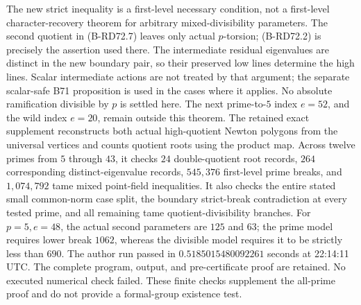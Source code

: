 \begin{remark}
\label{rem:B-RD72-scope}
The new strict inequality is a first-level necessary condition,
not a first-level character-recovery theorem for arbitrary
mixed-divisibility parameters. The second quotient in
(B-RD72.7) leaves only actual \(p\)-torsion; (B-RD72.2) is
precisely the assertion used there.
The intermediate residual eigenvalues are distinct in the new
boundary pair, so their preserved low lines determine the high
lines. Scalar intermediate actions are not treated by that
argument; the separate scalar-safe B71 proposition is used in
the cases where it applies.
No absolute ramification divisible by \(p\) is settled here.
The next prime-to-\(5\) index \(e=52\), and the wild index
\(e=20\), remain outside this theorem.
The retained exact supplement
reconstructs both actual high-quotient Newton polygons from the
universal vertices and counts quotient roots using the product map.
Across twelve primes from \(5\) through \(43\), it checks
\(24\) double-quotient root records, \(264\) corresponding
distinct-eigenvalue records, \(545{,}376\) first-level prime breaks,
and \(1{,}074{,}792\) tame mixed point-field inequalities.
It also checks the entire stated small common-norm case split,
the boundary strict-break contradiction at every tested prime,
and all remaining tame quotient-divisibility branches.
For \(p=5,e=48\), the actual second parameters are \(125\) and
\(63\); the prime model requires lower break \(1062\), whereas
the divisible model requires it to be strictly less than \(690\).
The author run passed in \(0.5185015480092261\) seconds at
22:14:11 UTC. The complete program, output, and pre-certificate
proof are retained. No executed numerical check failed.
These finite checks supplement the all-prime proof and do not
provide a formal-group existence test.
\end{remark}
